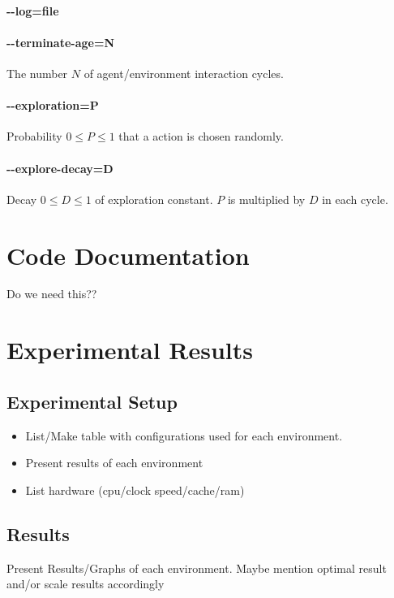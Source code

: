 \documentclass[paper=a4, fontsize=11pt]{scrartcl} %
\numberwithin{equation}{section} %
\numberwithin{figure}{section} %
\numberwithin{table}{section} %
\begin{document}
\paragraph{-{}-log=file}
\paragraph{-{}-terminate-age=N} The number $N$ of agent/environment interaction cycles.
\paragraph{-{}-exploration=P} Probability $0 \leq P \leq 1$ that a action is chosen randomly.
\paragraph{-{}-explore-decay=D} Decay $0 \leq D \leq 1$ of exploration constant. $P$ is multiplied by $D$ in each cycle.

\section{Code Documentation}
Do we need this??

\section{Experimental Results}
\subsection{Experimental Setup}

\begin{itemize}
    \item List/Make table with configurations used for each environment.
    \item Present results of each environment
    \item List hardware (cpu/clock speed/cache/ram)
\end{itemize}

\subsection{Results}
Present Results/Graphs of each environment. Maybe mention optimal result and/or scale results accordingly
\end{document}
